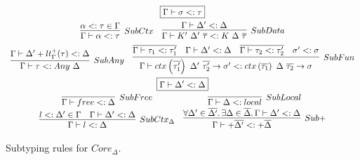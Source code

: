 \documentclass[acmsmall,review,screen]{acmart}
\newcommand{\mathframebox}[1]{\framebox{$\displaystyle #1$}}
\newcommand{\ap}{~}
\newcommand{\ctx}[1]{ctx\left(#1\right)~}
\begin{document}
\begin{figure}
    \begin{gather*}
        \mathframebox{\Gamma\vdash \sigma <: \tau} \\
        \begin{array}{cc}
            \infer[SubCtx]{\Gamma\vdash \alpha <: \tau}{\alpha <: \tau \in \Gamma} &
            \infer[SubData]{
                \Gamma\vdash K'\ap\Delta'\ap\overline{\tau} <: K\ap\Delta\ap\overline{\tau}
            }{
                \Gamma\vdash\Delta' <: \Delta
            }
        \end{array} \\
        \begin{array}{cc}
            \infer[SubAny]{
                \Gamma\vdash \tau <: Any\ap\Delta
            }{
                \Gamma\vdash \Delta'+lt_\Gamma^+(\tau) <: \Delta
            } &
            \infer[SubFun]{
                \Gamma\vdash\ctx{\overline{\tau_1'}}\Delta'~\overline{\tau_2'}\to\sigma' <: \ctx{\overline{\tau_1}}\Delta~\overline{\tau_2}\to\sigma
            }{
                \overline{\Gamma\vdash\tau_1 <: \tau_1'} &
                \Gamma\vdash\Delta' <: \Delta &
                \overline{\Gamma\vdash\tau_2 <: \tau_2'} &
                \sigma' <: \sigma
            }
        \end{array} \\
        \mathframebox{\Gamma\vdash\Delta' <: \Delta} \\
        \begin{array}{cc}
            \infer[SubFree]{\Gamma\vdash free <: \Delta}{} &
            \infer[SubLocal]{\Gamma\vdash\Delta <: local}{} \\
            \infer[SubCtx_\Delta]{
                \Gamma\vdash l <: \Delta
            }{
                l <: \Delta' \in \Gamma & \Gamma\vdash\Delta' <: \Delta
            } &
            \infer[Sub+]{
                \Gamma\vdash+\overline{\Delta'} <: +\overline{\Delta}
            }{
                \forall\Delta'\in\overline{\Delta'}\ldotp\exists\Delta\in\overline{\Delta}\ldotp \Gamma\vdash\Delta' <: \Delta
            }
        \end{array}
    \end{gather*}
    \caption{Subtyping rules for $Core_{\Delta}$.}
    \label{fig:core-delta-subtyping}
\end{figure}

\end{document}
